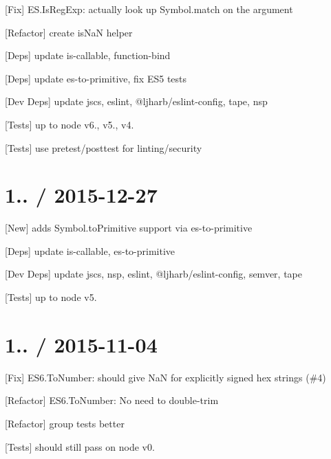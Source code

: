 \begin{DoxyItemize}
\item \mbox{[}Fix\mbox{]} {\ttfamily E\+S.\+Is\+Reg\+Exp}\+: actually look up {\ttfamily Symbol.\+match} on the argument
\item \mbox{[}Refactor\mbox{]} create {\ttfamily is\+NaN} helper
\item \mbox{[}Deps\mbox{]} update {\ttfamily is-\/callable}, {\ttfamily function-\/bind}
\item \mbox{[}Deps\mbox{]} update {\ttfamily es-\/to-\/primitive}, fix E\+S5 tests
\item \mbox{[}Dev Deps\mbox{]} update {\ttfamily jscs}, {\ttfamily eslint}, {\ttfamily @ljharb/eslint-\/config}, {\ttfamily tape}, {\ttfamily nsp}
\item \mbox{[}Tests\mbox{]} up to {\ttfamily node} {\ttfamily v6.}, {\ttfamily v5.}, {\ttfamily v4.}
\item \mbox{[}Tests\mbox{]} use pretest/posttest for linting/security
\end{DoxyItemize}

\section*{1.. / 2015-\/12-\/27 }


\begin{DoxyItemize}
\item \mbox{[}New\mbox{]} adds {\ttfamily Symbol.\+to\+Primitive} support via {\ttfamily es-\/to-\/primitive}
\item \mbox{[}Deps\mbox{]} update {\ttfamily is-\/callable}, {\ttfamily es-\/to-\/primitive}
\item \mbox{[}Dev Deps\mbox{]} update {\ttfamily jscs}, {\ttfamily nsp}, {\ttfamily eslint}, {\ttfamily @ljharb/eslint-\/config}, {\ttfamily semver}, {\ttfamily tape}
\item \mbox{[}Tests\mbox{]} up to {\ttfamily node} {\ttfamily v5.}
\end{DoxyItemize}

\section*{1.. / 2015-\/11-\/04 }


\begin{DoxyItemize}
\item \mbox{[}Fix\mbox{]} {\ttfamily E\+S6.\+To\+Number}\+: should give {\ttfamily NaN} for explicitly signed hex strings (\#4)
\item \mbox{[}Refactor\mbox{]} {\ttfamily E\+S6.\+To\+Number}\+: No need to double-\/trim
\item \mbox{[}Refactor\mbox{]} group tests better
\item \mbox{[}Tests\mbox{]} should still pass on {\ttfamily node} {\ttfamily v0.}
\end{DoxyItemize}

